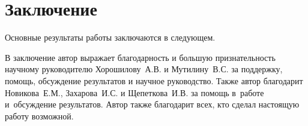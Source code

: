 \chapter*{Заключение}						%


Основные результаты работы заключаются в следующем.


В заключение автор
выражает благодарность и большую признательность научному руководителю
Хорошилову~А.\:В. и Мутилину~В.\:С. за поддержку, помощь, обсуждение результатов и научное
руководство.
Также автор благодарит Новикова~Е.\:М., Захарова~И.\:С. и Щепеткова~И.\:В. за
помощь в~работе и~обсуждение результатов.
Автор также благодарит всех, кто сделал настоящую работу возможной.
